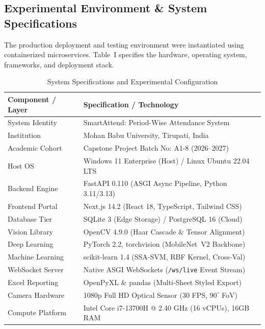 \documentclass[conference]{IEEEtran}
\begin{document}
\subsection{Experimental Environment \& System Specifications}
The production deployment and testing environment were instantiated using containerized microservices. Table~I specifies the hardware, operating system, frameworks, and deployment stack.

\begin{table}[htbp]
\caption{System Specifications and Experimental Configuration}
\begin{center}
\begin{tabular}{ll}
\toprule
\textbf{Component / Layer} & \textbf{Specification / Technology} \\
\midrule
System Identity & SmartAttend: Period-Wise Attendance System \\
Institution & Mohan Babu University, Tirupati, India \\
Academic Cohort & Capstone Project Batch No: A1-8 (2026--2027) \\
Host OS & Windows 11 Enterprise (Host) / Linux Ubuntu 22.04 LTS \\
Backend Engine & FastAPI 0.110 (ASGI Async Pipeline, Python 3.11/3.13) \\
Frontend Portal & Next.js 14.2 (React 18, TypeScript, Tailwind CSS) \\
Database Tier & SQLite 3 (Edge Storage) / PostgreSQL 16 (Cloud) \\
Vision Library & OpenCV 4.9.0 (Haar Cascade \& Tensor Alignment) \\
Deep Learning & PyTorch 2.2, torchvision (MobileNet~V2 Backbone) \\
Machine Learning & scikit-learn 1.4 (SSA-SVM, RBF Kernel, Cross-Val) \\
WebSocket Server & Native ASGI WebSockets (\texttt{/ws/live} Event Stream) \\
Excel Reporting & OpenPyXL \& pandas (Multi-Sheet Styled Export) \\
Camera Hardware & 1080p Full HD Optical Sensor (30 FPS, $90^\circ$ FoV) \\
Compute Platform & Intel Core i7-13700H @ 2.40 GHz (16 vCPUs), 16GB RAM \\
\bottomrule
\end{tabular}
\end{center}
\end{table}
\end{document}
